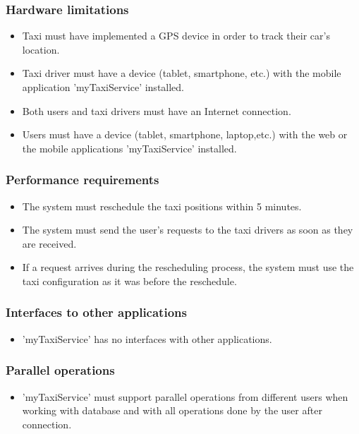 \documentclass{article}
\begin{document}
	    \subsubsection{Hardware limitations}
    	    \begin{itemize}
    	        \item Taxi must have implemented a GPS device in order to track their car's location.
    	        \item Taxi driver must have a device (tablet, smartphone, etc.) with the mobile application 'myTaxiService' installed.
    	        \item Both users and taxi drivers must have an Internet connection.
    	        \item Users must have a device (tablet, smartphone, laptop,etc.) with the web or the mobile applications 'myTaxiService' installed.
    	    \end{itemize}
    	\subsubsection{Performance requirements}
    	    \begin{itemize}
    	        \item The system must reschedule the taxi positions within 5 minutes.
    	        \item The system must send the user's requests to the taxi drivers as soon as they are received.
    	        \item If a request arrives during the rescheduling process, the system must use the taxi configuration as it was before the reschedule.
    	    \end{itemize}
    	\subsubsection{Interfaces to other applications}
    	    \begin{itemize}
    	        \item 'myTaxiService' has no interfaces with other applications.
    	    \end{itemize}
        \subsubsection{Parallel operations}
            \begin{itemize}
                \item 'myTaxiService' must support parallel operations from different users when working with database and with all operations done by the user after connection.
            \end{itemize}
       
\end{document}
